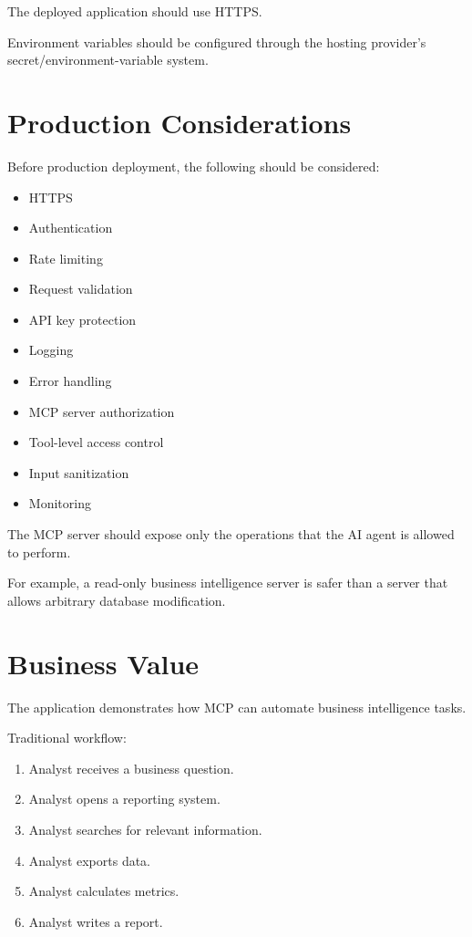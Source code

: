 \documentclass[11pt,a4paper]{article}
\begin{document}
The deployed application should use HTTPS.

Environment variables should be configured through the hosting provider's
secret/environment-variable system.

\section{Production Considerations}

Before production deployment, the following should be considered:

\begin{itemize}
\item HTTPS
\item Authentication
\item Rate limiting
\item Request validation
\item API key protection
\item Logging
\item Error handling
\item MCP server authorization
\item Tool-level access control
\item Input sanitization
\item Monitoring
\end{itemize}

The MCP server should expose only the operations that the AI agent is
allowed to perform.

For example, a read-only business intelligence server is safer than
a server that allows arbitrary database modification.

\section{Business Value}

The application demonstrates how MCP can automate business intelligence
tasks.

Traditional workflow:

\begin{enumerate}
\item Analyst receives a business question.
\item Analyst opens a reporting system.
\item Analyst searches for relevant information.
\item Analyst exports data.
\item Analyst calculates metrics.
\item Analyst writes a report.
\end{enumerate}
\end{document}
